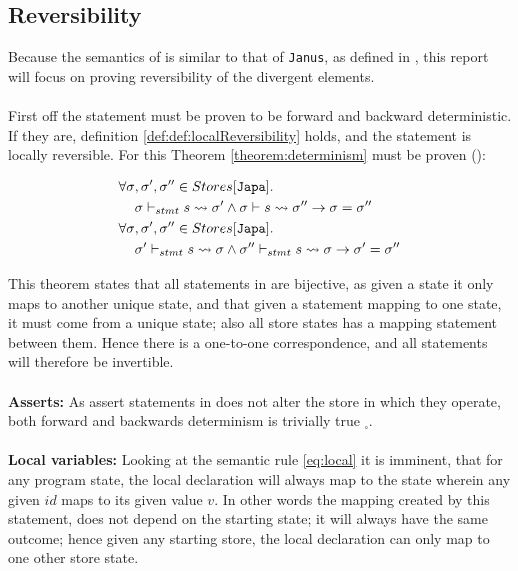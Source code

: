 \subsection{Reversibility \rr} \label{subsec:reversibility}
Because the semantics of \lan is similar to that of \texttt{Janus}, as defined in \cite{janus},
this report will focus on proving reversibility of the divergent elements.
\\
\\
First off the statement must be proven to be forward and backward deterministic. If they are,
definition \ref{def:def:localReversibility} holds, and the statement is locally reversible.
For this Theorem \ref{theorem:determinism} must be proven (\cite{janus}):
\begin{theorem} \label{theorem:determinism}
    \begin{align*}
        \forall \sigma&, \sigma', \sigma''\in Stores[\texttt{Japa}]. \\
        &\sigma \vdash_{stmt} s \leadsto \sigma' \land \sigma \vdash s \leadsto \sigma''
            \rightarrow \sigma = \sigma'' \\
        \forall \sigma&, \sigma', \sigma''\in Stores[\texttt{Japa}]. \\
        &\sigma' \vdash_{stmt} s \leadsto \sigma \land \sigma'' \vdash_{stmt} s \leadsto \sigma
            \rightarrow \sigma' = \sigma''
    \end{align*}
\end{theorem}
\noindent
This theorem states that all statements in \lan are bijective, as given a state it only maps to
another unique state, and that given a statement mapping to one state, it must come from a
unique state; also all store states has a mapping statement between them.
Hence there is a one-to-one correspondence, and all statements will therefore be
invertible.
\\
\\
\textbf{Asserts:}
As assert statements in \lan does not alter the store in which they operate, both
forward and backwards determinism is trivially true $_\square$.
\\
\\
\textbf{Local variables:}
Looking at the semantic rule \eqref{eq:local} it is imminent, that for any program state,
the local declaration will always map to the state wherein any given $id$ maps to its given value
$v$. In other words the mapping created by this statement, does not depend on the starting state;
it will always have the same outcome; hence given any starting store, the local declaration can
only map to one other store state.

